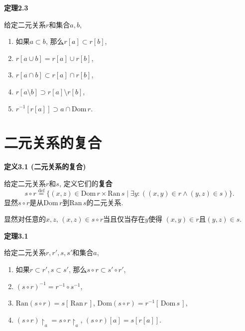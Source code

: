 \documentclass[UTF8]{ctexart}
\begin{document}
\vspace{10pt}

\hypertarget{sec:定理2.3}{}
\noindent\textbf{定理2.3}

给定二元关系$r$和集合$a,b$,
\begin{enumerate}
    \item 如果$a\subset b$, 那么$r[a]\subset r[b]$,
    \item $r[a\cup b]=r[a]\cup r[b]$,
    \item $r[a\cap b]\subset r[a]\cap r[b]$,
    \item $r[a\setminus b]\supset r[a]\setminus r[b]$,
    \item $r^{-1}[r[a]]\supset a\cap\mathrm{Dom}\,r$.
\end{enumerate}





\newpage

\section{二元关系的复合}

\hypertarget{sec:定义3.1}{}
\noindent\textbf{定义3.1 (二元关系的复合)}

给定二元关系$r$和$s$, 定义它们的\textbf{复合}
\[
    s\circ r\overset{\mathrm{def}}{=}
    \{(x,z)\in\mathrm{Dom}\,r\times\mathrm{Ran}\,s\mid
    \exists y:((x,y)\in r\land(y,z)\in s)\}.
\]
显然$s\circ r$是从$\mathrm{Dom}\,r$到$\mathrm{Ran}\,s$的二元关系.

显然对任意的$x,z$, $(x,z)\in s\circ r$当且仅当存在$y$使得
$(x,y)\in r$且$(y,z)\in s$.

\vspace{10pt}

\hypertarget{sec:定理3.1}{}
\noindent\textbf{定理3.1}

给定二元关系$r,r',s,s'$和集合$a$,
\begin{enumerate}
    \item 如果$r\subset r',s\subset s'$, 那么$s\circ r\subset s'\circ r'$,
    \item $(s\circ r)^{-1}=r^{-1}\circ s^{-1}$,
    \item $\mathrm{Ran}(s\circ r)=s[\,\mathrm{Ran}\,r\,]$,
    $\mathrm{Dom}(s\circ r)=r^{-1}[\,\mathrm{Dom}\,s\,]$,
    \item $(s\circ r)\!\restriction_a=s\circ r\!\restriction_a$,
    $(s\circ r)[a]=s[r[a]]$.
\end{enumerate}

\end{document}
